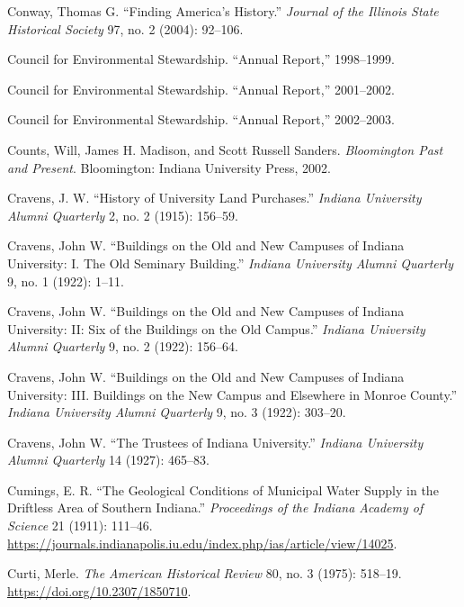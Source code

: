 \documentclass[
  american,
  letterpaper,
]{scrreprt}
\newlength{\cslhangindent}
\newenvironment{CSLReferences}[2] %
 {\begin{list}{}{%
  \setlength{\itemindent}{0pt}
  \setlength{\leftmargin}{0pt}
  \setlength{\parsep}{0pt}
  \ifodd #1
   \setlength{\leftmargin}{\cslhangindent}
   \setlength{\itemindent}{-1\cslhangindent}
  \fi
  \setlength{\itemsep}{#2\baselineskip}}}
 {\end{list}}
\begin{document}
\begin{CSLReferences}{1}{0}
Conway, Thomas G. {``Finding America's History.''} \emph{Journal of the
Illinois State Historical Society} 97, no. 2 (2004): 92--106.

Council for Environmental Stewardship. {``Annual Report,''} 1998--1999.

Council for Environmental Stewardship. {``Annual Report,''} 2001--2002.

Council for Environmental Stewardship. {``Annual Report,''} 2002--2003.

Counts, Will, James H. Madison, and Scott Russell Sanders.
\emph{Bloomington Past and Present}. Bloomington: Indiana University
Press, 2002.

Cravens, J. W. {``History of University Land Purchases.''} \emph{Indiana
University Alumni Quarterly} 2, no. 2 (1915): 156--59.

Cravens, John W. {``Buildings on the Old and New Campuses of Indiana
University: I. The Old Seminary Building.''} \emph{Indiana University
Alumni Quarterly} 9, no. 1 (1922): 1--11.

Cravens, John W. {``Buildings on the Old and New Campuses of Indiana
University: II: Six of the Buildings on the Old Campus.''} \emph{Indiana
University Alumni Quarterly} 9, no. 2 (1922): 156--64.

Cravens, John W. {``Buildings on the Old and New Campuses of Indiana
University: III. Buildings on the New Campus and Elsewhere in Monroe
County.''} \emph{Indiana University Alumni Quarterly} 9, no. 3 (1922):
303--20.

Cravens, John W. {``The Trustees of Indiana University.''} \emph{Indiana
University Alumni Quarterly} 14 (1927): 465--83.

Cumings, E. R. {``The Geological Conditions of Municipal Water Supply in
the Driftless Area of Southern Indiana.''} \emph{Proceedings of the
Indiana Academy of Science} 21 (1911): 111--46.
\url{https://journals.indianapolis.iu.edu/index.php/ias/article/view/14025}.

Curti, Merle. \emph{The American Historical Review} 80, no. 3 (1975):
518--19. \url{https://doi.org/10.2307/1850710}.


\end{CSLReferences}
\end{document}
